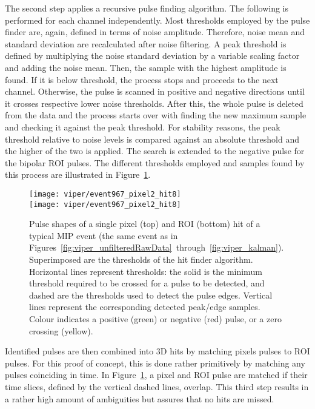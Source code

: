 The second step applies a recursive pulse finding algorithm.
The following is performed for each channel independently.
Most thresholds employed by the pulse finder are, again, defined in terms of noise amplitude.
Therefore, noise mean and standard deviation are recalculated after noise filtering.
A peak threshold is defined by multiplying the noise standard deviation by a variable scaling factor and adding the noise mean.
Then, the sample with the highest amplitude is found.
If it is below threshold, the process stops and proceeds to the next channel.
Otherwise, the pulse is scanned in positive and negative directions until it crosses respective lower noise thresholds.
After this, the whole pulse is deleted from the data and the process starts over with finding the new maximum sample and checking it against the peak threshold.
For stability reasons, the peak threshold relative to noise levels is compared against an absolute threshold and the higher of the two is applied.
The search is extended to the negative pulse for the bipolar ROI pulses.
The different thresholds employed and samples found by this process are illustrated in Figure~\ref{fig:viper_hitFinder}.

\begin{figure}[htb]
	\centering
	\texttt{[image: viper/event967\_pixel2\_hit8]}\\
	\texttt{[image: viper/event967\_pixel2\_hit8]}
	\caption{Pulse shapes of a single pixel (top) and ROI (bottom) hit of a typical MIP event (the same event as in Figures~\ref{fig:viper_unfilteredRawData}~through~\ref{fig:viper_kalman}).
	Superimposed are the thresholds of the hit finder algorithm. Horizontal lines represent thresholds: the solid is the minimum threshold required to be crossed for a pulse to be detected, and dashed are the thresholds used to detect the pulse edges.
	Vertical lines represent the corresponding detected peak/edge samples.
	Colour indicates a positive (green) or negative (red) pulse, or a zero crossing (yellow).}
	\label{fig:viper_hitFinder}
\end{figure}

Identified pulses are then combined into 3D hits by matching pixels pulses to ROI pulses.
For this proof of concept, this is done rather primitively by matching any pulses coinciding in time.
In Figure~\ref{fig:viper_hitFinder}, a pixel and ROI pulse are matched if their time slices, defined by the vertical dashed lines, overlap.
This third step results in a rather high amount of ambiguities but assures that no hits are missed.

